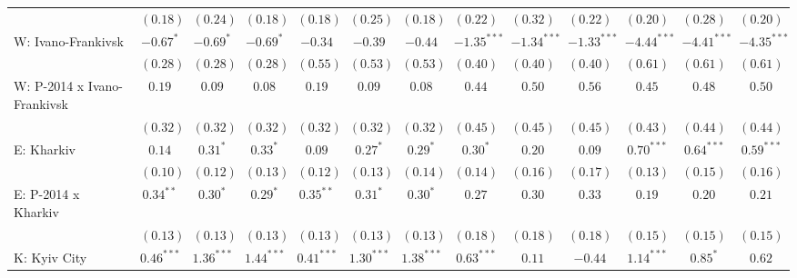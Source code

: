 \begin{table}
\begin{center}
\begin{tiny}
\begin{tabular}{l c c c c c c c c c c c c}
                            & $(0.18)$      & $(0.24)$      & $(0.18)$      & $(0.18)$     & $(0.25)$     & $(0.18)$     & $(0.22)$      & $(0.32)$      & $(0.22)$       & $(0.20)$      & $(0.28)$      & $(0.20)$      \\
W: Ivano-Frankivsk          & $-0.67^{*}$   & $-0.69^{*}$   & $-0.69^{*}$   & $-0.34$      & $-0.39$      & $-0.44$      & $-1.35^{***}$ & $-1.34^{***}$ & $-1.33^{***}$  & $-4.44^{***}$ & $-4.41^{***}$ & $-4.35^{***}$ \\
                            & $(0.28)$      & $(0.28)$      & $(0.28)$      & $(0.55)$     & $(0.53)$     & $(0.53)$     & $(0.40)$      & $(0.40)$      & $(0.40)$       & $(0.61)$      & $(0.61)$      & $(0.61)$      \\
W: P-2014 x Ivano-Frankivsk & $0.19$        & $0.09$        & $0.08$        & $0.19$       & $0.09$       & $0.08$       & $0.44$        & $0.50$        & $0.56$         & $0.45$        & $0.48$        & $0.50$        \\
                            & $(0.32)$      & $(0.32)$      & $(0.32)$      & $(0.32)$     & $(0.32)$     & $(0.32)$     & $(0.45)$      & $(0.45)$      & $(0.45)$       & $(0.43)$      & $(0.44)$      & $(0.44)$      \\
E: Kharkiv                  & $0.14$        & $0.31^{*}$    & $0.33^{*}$    & $0.09$       & $0.27^{*}$   & $0.29^{*}$   & $0.30^{*}$    & $0.20$        & $0.09$         & $0.70^{***}$  & $0.64^{***}$  & $0.59^{***}$  \\
                            & $(0.10)$      & $(0.12)$      & $(0.13)$      & $(0.12)$     & $(0.13)$     & $(0.14)$     & $(0.14)$      & $(0.16)$      & $(0.17)$       & $(0.13)$      & $(0.15)$      & $(0.16)$      \\
E: P-2014 x Kharkiv         & $0.34^{**}$   & $0.30^{*}$    & $0.29^{*}$    & $0.35^{**}$  & $0.31^{*}$   & $0.30^{*}$   & $0.27$        & $0.30$        & $0.33$         & $0.19$        & $0.20$        & $0.21$        \\
                            & $(0.13)$      & $(0.13)$      & $(0.13)$      & $(0.13)$     & $(0.13)$     & $(0.13)$     & $(0.18)$      & $(0.18)$      & $(0.18)$       & $(0.15)$      & $(0.15)$      & $(0.15)$      \\
K: Kyiv City                & $0.46^{***}$  & $1.36^{***}$  & $1.44^{***}$  & $0.41^{***}$ & $1.30^{***}$ & $1.38^{***}$ & $0.63^{***}$  & $0.11$        & $-0.44$        & $1.14^{***}$  & $0.85^{*}$    & $0.62$        \\

\end{tabular}
\end{tiny}
\end{center}
\end{table}
